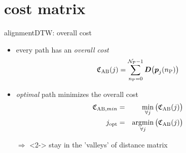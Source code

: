     \section[cost]{cost matrix}
        \begin{frame}{alignment}{DTW: overall cost}
            \begin{itemize}
                \item	every path has an \textit{overall cost}
                    \begin{equation*}
                        \mathfrak{C}_{\mathrm{AB}}(j) = \sum\limits_{n_\mathrm{P}= 0}^{\mathcal{N}_{\mathrm{P}}-1}{\mat{D}\big(\vec{P}_j(n_\mathrm{P})\big)} 
                    \end{equation*}
                \item<2->	\textit{optimal} path minimizes the overall cost
                    \begin{eqnarray*}
                        \mathfrak{C}_{\mathrm{AB},min} &=& \min\limits_{\forall j}\big(\mathfrak{C}_{\mathrm{AB}}(j)\big) \\
                        j_\mathrm{opt} 				&=& \operatorname*{argmin}\limits_{\forall j}\big(\mathfrak{C}_{\mathrm{AB}}(j)\big) 
                    \end{eqnarray*}
                \item[$\Rightarrow$]<2-> stay in the 'valleys' of distance matrix
            \end{itemize}
        \end{frame}
